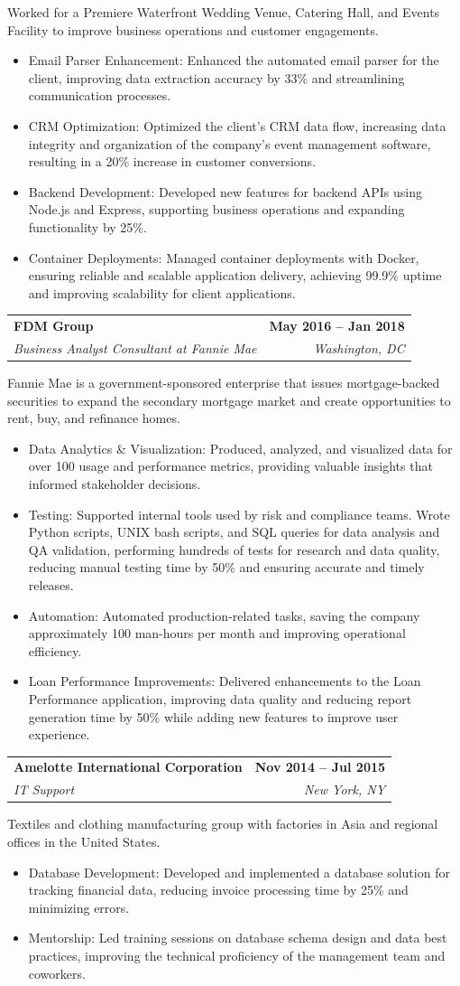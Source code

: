 \documentclass[letterpaper,11pt]{article}
\makeatletter
\newcommand{\resumeItem}[1]{
  \item\small{
    {#1 \vspace{-2pt}}
  }
}
\newcommand{\resumeSubheading}[4]{
  \vspace{-2pt}\item
    \begin{tabular*}{1.0\textwidth}[t]{l@{\extracolsep{\fill}}r}
      \textbf{#1} & \textbf{\small #2} \\
      \textit{\small#3} & \textit{\small #4} \\
    \end{tabular*}\vspace{-7pt}
}
\newcommand{\resumeItemListStart}{\begin{itemize}}
\newcommand{\resumeItemListEnd}{\end{itemize}\vspace{-5pt}}
\makeatother
\begin{document}
      Worked for a Premiere Waterfront Wedding Venue, Catering Hall, and Events Facility to improve business operations and customer engagements.
      \resumeItemListStart
        \resumeItem{Email Parser Enhancement: Enhanced the automated email parser for the client, improving data extraction accuracy by 33\% and streamlining communication processes.}
        \resumeItem{CRM Optimization: Optimized the client's CRM data flow, increasing data integrity and organization of the company's event management software, resulting in a 20\% increase in customer conversions.}
        \resumeItem{Backend Development: Developed new features for backend APIs using Node.js and Express, supporting business operations and expanding functionality by 25\%.}
        \resumeItem{Container Deployments: Managed container deployments with Docker, ensuring reliable and scalable application delivery, achieving 99.9\% uptime and improving scalability for client applications.}
      \resumeItemListEnd

    \resumeSubheading
      {FDM Group}{May 2016 -- Jan 2018}
      {Business Analyst Consultant at Fannie Mae}{Washington, DC}

      Fannie Mae is a government-sponsored enterprise that issues mortgage-backed securities to expand the secondary mortgage market and create opportunities to rent, buy, and refinance homes.
      \resumeItemListStart
        \resumeItem{Data Analytics \& Visualization: Produced, analyzed, and visualized data for over 100 usage and performance metrics, providing valuable insights that informed stakeholder decisions.}
        \resumeItem{Testing: Supported internal tools used by risk and compliance teams. Wrote Python scripts, UNIX bash scripts, and SQL queries for data analysis and QA validation, performing hundreds of tests for research and data quality, reducing manual testing time by 50\% and ensuring accurate and timely releases.}
        \resumeItem{Automation: Automated production-related tasks, saving the company approximately 100 man-hours per month and improving operational efficiency.}
        \resumeItem{Loan Performance Improvements: Delivered enhancements to the Loan Performance application, improving data quality and reducing report generation time by 50\% while adding new features to improve user experience.}
      \resumeItemListEnd

    \resumeSubheading
      {Amelotte International Corporation}{Nov 2014 -- Jul 2015}
      {IT Support}{New York, NY}

      Textiles and clothing manufacturing group with factories in Asia and regional offices in the United States.
      \resumeItemListStart
        \resumeItem{Database Development: Developed and implemented a database solution for tracking financial data, reducing invoice processing time by 25\% and minimizing errors.}
        \resumeItem{Mentorship: Led training sessions on database schema design and data best practices, improving the technical proficiency of the management team and coworkers.}
      \resumeItemListEnd
\end{document}
